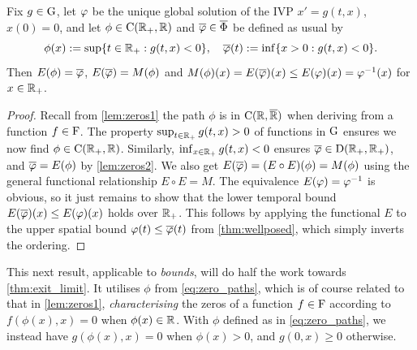 \begin{corollary}\label{cor:exit_lower}
    Fix $g\in\mathrm{G}$, let $\varphi$ be the unique global solution of the IVP $x'=g(t,x)$, $x(0)=0$, and let $\phi\in\mathrm{C}(\mathbb{R}_+,\mathbb{R})$ and $\overline{\varphi}\in\overline{\Phi}$ be defined as usual by
    \begin{equation}\label{eq:zero_paths}
        \phi(x) := \sup\{t\in\mathbb{R}_+:g(t,x)<0\},\quad \overline{\varphi}(t):=\inf\{x>0:g(t,x)<0\}.
    \end{equation}
    Then $E(\phi)=\overline{\varphi}$, $E(\overline{\varphi})=M(\phi)$ and $M(\phi)(x) = E(\overline{\varphi})(x) \le E(\varphi)(x)=\varphi^{-1}(x)$ for $x\in\mathbb{R}_+$.
\end{corollary}
\begin{proof}
    Recall from \autoref{lem:zeros1} the path $\phi$ is in $\mathrm{C}(\mathbb{R},{\overline{\mathbb{R}}})$ when deriving from a function $f\in\mathrm{F}$. The property $\sup_{t\in\mathbb{R}_+}g(t,x)>0$ of functions in $\mathrm{G}$ ensures we now find $\phi\in\mathrm{C}(\mathbb{R}_+,\mathbb{R})$. Similarly, $\inf_{x\in\mathbb{R}_+}g(t,x)<0$ ensures $\overline{\varphi}\in\mathrm{D}(\mathbb{R}_+,\mathbb{R}_+)$, and $\overline{\varphi}=E(\phi)$ by \autoref{lem:zeros2}. We also get $E(\overline{\varphi})=(E\circ E)(\phi)=M(\phi)$ using the general functional relationship $E\circ E= M$. The equivalence $E(\varphi)=\varphi^{-1}$ is obvious, so it just remains to show that the lower temporal bound $E(\overline{\varphi})(x) \le E(\varphi)(x)$ holds over $\mathbb{R}_+$. This follows by applying the functional $E$ to the upper spatial bound $\varphi(t)\le\overline{\varphi}(t)$ from \autoref{thm:wellposed}, which simply inverts the ordering.
\end{proof}

This next result, applicable to \emph{bounds}, will do half the work towards \autoref{thm:exit_limit}. It utilises $\phi$ from \autoref{eq:zero_paths}, which is of course related to that in \autoref{lem:zeros1}, \emph{characterising} the zeros of a function $f\in\mathrm{F}$ according to $f(\phi(x),x)=0$ when $\phi(x)\in\mathbb{R}$. With $\phi$ defined as in \autoref{eq:zero_paths}, we instead have $g(\phi(x),x)=0$ when $\phi(x)>0$, and $g(0,x)\ge0$ otherwise.

